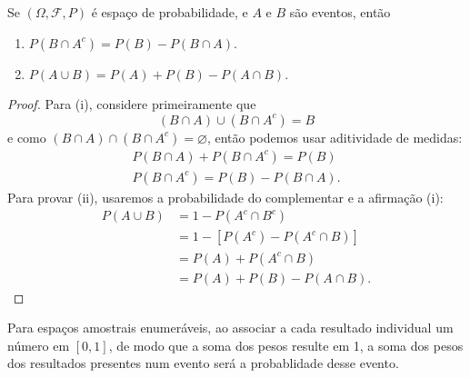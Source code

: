 \begin{thm:base2 calc prob}
\label{thm:base2 calc prob}
Se $(\Omega, \mathcal{F}, P)$ é espaço de probabilidade, e $A$ e $B$ são eventos, então
\begin{enumerate}
	\item[i] $P(B \cap A^c) = P(B) - P(B \cap A)$.
	\item[ii] $P(A \cup B) = P(A) + P(B) - P(A \cap B)$.
\end{enumerate}
\begin{proof}
	Para (i), considere primeiramente que
	\[
		(B \cap A) \cup (B \cap A^c) = B
	\]
	e como $(B \cap A) \cap (B \cap A^c) = \varnothing$, então podemos usar aditividade
	de medidas:
	\begin{gather*}
		P(B \cap A) + P(B \cap A^c) = P(B) \\
		P(B \cap A^c) = P(B) - P(B \cap A).
	\end{gather*}
	Para provar (ii), usaremos a probabilidade do complementar e a afirmação (i):
	\begin{align*}
		P(A \cup B) & = 1 - P(A^c \cap B^c)          \\
		            & = 1 - [P(A^c) - P(A^c \cap B)] \\
		            & = P(A) + P(A^c \cap B)         \\
		            & = P(A) + P(B) - P(A \cap B).
	\end{align*}
\end{proof}
\end{thm:base2 calc prob}

Para espaços amostrais enumeráveis, ao associar a cada resultado individual
um número em $[0, 1]$, de modo que a soma dos pesos resulte em 1, a soma dos pesos dos
resultados presentes num evento será a probablidade desse evento.

